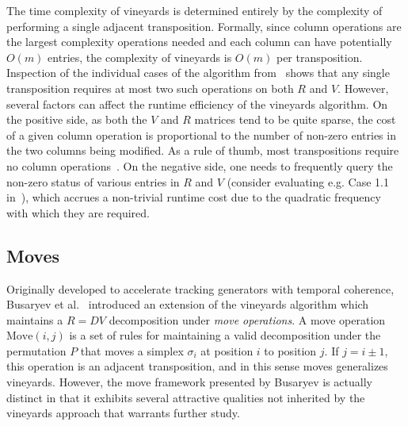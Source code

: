 \documentclass[sn-mathphys]{sn-jnl}
\begin{document}
 The time complexity of vineyards is determined entirely by the complexity of performing a single adjacent transposition.
Formally, since column operations are the largest complexity operations needed and each column can have potentially $O(m)$ entries, the complexity of vineyards is $O(m)$ per transposition. 
Inspection of the individual cases of the algorithm from~\cite{cohen2006vines} shows that any single transposition requires at most two such operations on both $R$ and $V$.
However, several factors can affect the runtime efficiency of the vineyards algorithm. 
On the positive side, as both the $V$ and $R$ matrices tend to be quite sparse, the cost of a given column operation is proportional to the number of non-zero  entries in the two columns being modified. As a rule of thumb, most transpositions require no column operations~\cite{edelsbrunner2000topological}. 
On the negative side, one needs to frequently query the non-zero status of various entries in $R$ and $V$ (consider evaluating e.g. Case 1.1 in~\cite{cohen2006vines}), which accrues a non-trivial runtime cost due to the quadratic frequency with which they are required.   
 

\subsection{Moves}\label{sec:moves} Originally developed to accelerate tracking generators with temporal coherence, Busaryev et al.~\cite{busaryev2010tracking} introduced an extension of the vineyards algorithm which maintains a $R = D V$ decomposition under \emph{move operations}. A move operation $\mathrm{Move}(i,j)$ is a set of rules for maintaining a valid decomposition under the permutation $P$ that moves a simplex $\sigma_i$ at position $i$ to position $j$. If $j = i \pm 1$, this operation is an adjacent transposition, and in this sense moves generalizes vineyards.
However, the move framework presented by Busaryev is actually distinct in that it exhibits several attractive qualities not inherited by the vineyards approach that warrants further study.  
\end{document}
